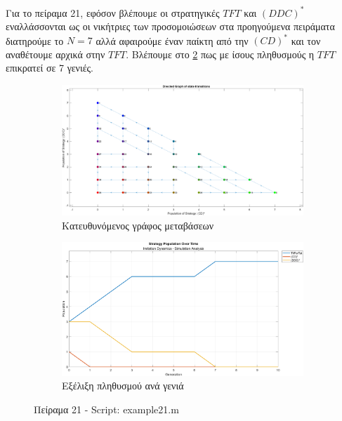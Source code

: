 \documentclass[12pt]{report}
\begin{document}
Για το πείραμα 21, εφόσον βλέπουμε οι στρατηγικές $TFT$ και $(DDC)^*$ εναλλάσσονται ως οι νικήτριες των προσομοιώσεων στα προηγούμενα πειράματα διατηρούμε το $N=7$ αλλά αφαιρούμε έναν παίκτη από την $(CD)^*$ και τον αναθέτουμε αρχικά στην $TFT$. Βλέπουμε στο \ref{fig:fig21-sim} πως με ίσους πληθυσμούς η $TFT$ επικρατεί σε 7 γενιές. 
\begin{figure}[H]
    \centering

    \begin{subfigure}[b]{0.45\textwidth}
        \includegraphics[width=\linewidth]{Figures Imitation Dynamics/example21.png}
        \caption{Κατευθυνόμενος γράφος μεταβάσεων}
        \label{fig:fig21}
    \end{subfigure}
    \hfill
    \begin{subfigure}[b]{0.45\textwidth}
        \includegraphics[width=\linewidth]{Figures Imitation Dynamics/example21-sim.png}
        \caption{Εξέλιξη πληθυσμού ανά γενιά}
        \label{fig:fig21-sim}
    \end{subfigure}

    \caption{Πείραμα 21 - \foreignlanguage{english}{Script: example21.m}}
    \label{fig:example21}
\end{figure}
\end{document}
